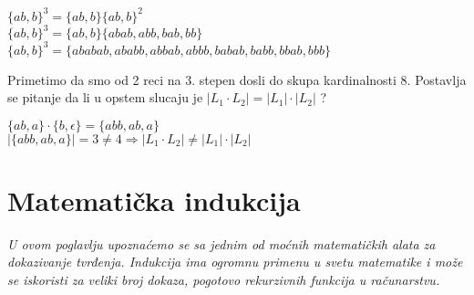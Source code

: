 \documentclass{memoir}
\begin{document}

\begin{primer}
 $ \{ab, b\}^3 = \{ab, b\}\{ab, b\}^2 $ \\
 $ \{ab, b\}^3 = \{ab, b\}\{abab, abb, bab, bb\} $ \\
 $ \{ab, b\}^3 = \{ababab, ababb, abbab, abbb, babab, babb, bbab, bbb \} $ \\
\end{primer}

Primetimo da smo od 2 reci na 3. stepen dosli do skupa kardinalnosti 8. Postavlja se pitanje da li u opstem slucaju je $|L_1 \cdot L_2| = |L_1| \cdot |L_2| $ ? 

\begin{primer}
 $ \{ab, a\} \cdot \{b, \epsilon\} = \{abb, ab, a\} $ \\
 $ |\{abb, ab, a\}| = 3 \not= 4 \Longrightarrow |L_1 \cdot L_2| \not= |L_1| \cdot |L_2| $
\end{primer}





\chapter{Matematička indukcija}
\emph{U ovom poglavlju upoznaćemo se sa jednim od moćnih matematičkih alata za dokazivanje tvrđenja. Indukcija ima ogromnu primenu
u svetu matematike i može se iskoristi za veliki broj dokaza, pogotovo rekurzivnih funkcija u 
računarstvu.}
\newpage
\end{document}
